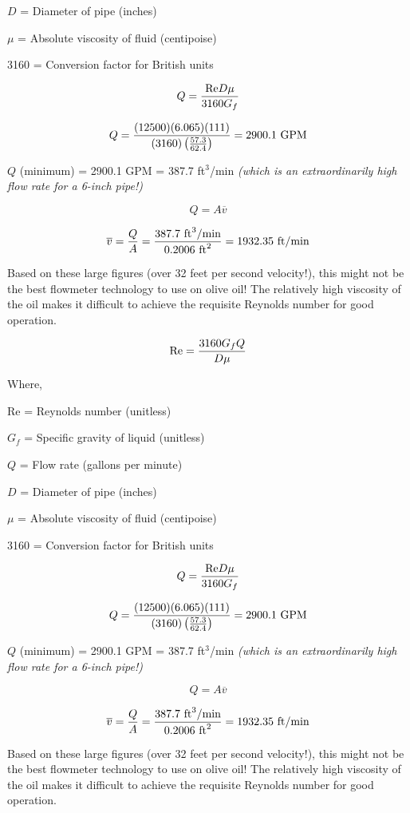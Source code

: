 $D$ = Diameter of pipe (inches)

$\mu$ = Absolute viscosity of fluid (centipoise)

3160 = Conversion factor for British units

\vskip 10pt


$$Q = {\hbox{Re} D \mu \over 3160 G_f}$$

$$Q = {(12500) (6.065) (111) \over (3160) \left(57.3 \over 62.4\right)} = 2900.1 \hbox{ GPM}$$

$Q$ (minimum) = 2900.1 GPM = 387.7 ft$^{3}$/min {\it (which is an extraordinarily high flow rate for a 6-inch pipe!)}

\vskip 10pt

$$Q = A \overline{v}$$

$$\overline{v} = {Q \over A} = {387.7 \hbox{ ft}^3\hbox{/min} \over 0.2006 \hbox{ ft}^2} = 1932.35 \hbox{ ft/min}$$

\vskip 10pt

Based on these large figures (over 32 feet per second velocity!), this might not be the best flowmeter technology to use on olive oil!  The relatively high viscosity of the oil makes it difficult to achieve the requisite Reynolds number for good operation.







$$\hbox{Re} = {{3160 G_f Q} \over {D \mu}}$$

\noindent
Where,

Re = Reynolds number (unitless)

$G_f$ = Specific gravity of liquid (unitless)

$Q$ = Flow rate (gallons per minute)

$D$ = Diameter of pipe (inches)

$\mu$ = Absolute viscosity of fluid (centipoise)

3160 = Conversion factor for British units

\vskip 10pt


$$Q = {\hbox{Re} D \mu \over 3160 G_f}$$

$$Q = {(12500) (6.065) (111) \over (3160) \left(57.3 \over 62.4\right)} = 2900.1 \hbox{ GPM}$$

$Q$ (minimum) = 2900.1 GPM = 387.7 ft$^{3}$/min {\it (which is an extraordinarily high flow rate for a 6-inch pipe!)}

\vskip 10pt

$$Q = A \overline{v}$$

$$\overline{v} = {Q \over A} = {387.7 \hbox{ ft}^3\hbox{/min} \over 0.2006 \hbox{ ft}^2} = 1932.35 \hbox{ ft/min}$$

\vskip 10pt

Based on these large figures (over 32 feet per second velocity!), this might not be the best flowmeter technology to use on olive oil!  The relatively high viscosity of the oil makes it difficult to achieve the requisite Reynolds number for good operation.




